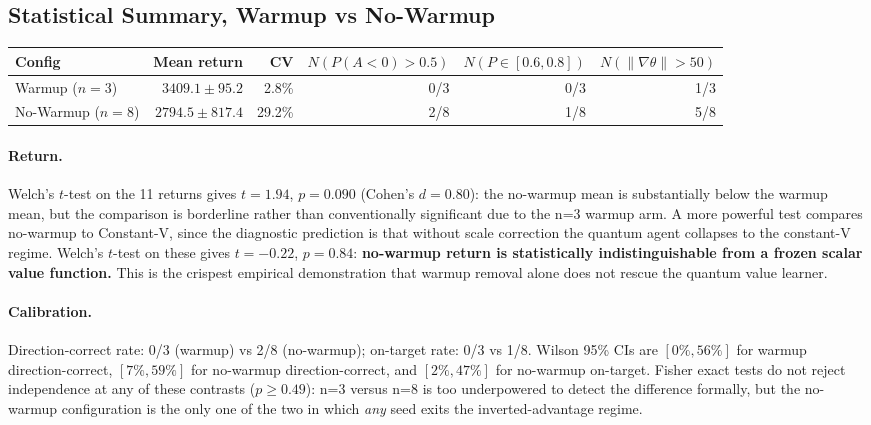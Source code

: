 \documentclass[10pt,a4paper]{article}
\begin{document}
\subsection{Statistical Summary, Warmup vs No-Warmup}

\begin{center}
\setlength{\tabcolsep}{5pt}
\begin{tabular}{lrrrrr}
\toprule
\textbf{Config} & \textbf{Mean return} & \textbf{CV}
  & $N(P(A{<}0)>0.5)$ & $N(P{\in}[0.6,0.8])$
  & $N(\|\nabla\theta\|>50)$ \\
\midrule
Warmup ($n=3$)    & $3409.1 \pm  95.2$ &  2.8\% & 0/3 & 0/3 & 1/3 \\
No-Warmup ($n=8$) & $2794.5 \pm 817.4$ & 29.2\% & 2/8 & 1/8 & 5/8 \\
\bottomrule
\end{tabular}
\end{center}

\paragraph{Return.} Welch's $t$-test on the 11 returns gives $t=1.94$,
$p=0.090$ (Cohen's $d=0.80$): the no-warmup mean is substantially below the
warmup mean, but the comparison is borderline rather than conventionally
significant due to the n=3 warmup arm.
A more powerful test compares no-warmup to Constant-V, since the diagnostic
prediction is that without scale correction the quantum agent collapses to the
constant-V regime. Welch's $t$-test on these gives $t=-0.22$, $p=0.84$:
\textbf{no-warmup return is statistically indistinguishable from a frozen
scalar value function.} This is the crispest empirical demonstration that
warmup removal alone does not rescue the quantum value learner.

\paragraph{Calibration.}
Direction-correct rate: 0/3 (warmup) vs 2/8 (no-warmup); on-target rate:
0/3 vs 1/8.
Wilson 95\% CIs are $[0\%,56\%]$ for warmup direction-correct,
$[7\%,59\%]$ for no-warmup direction-correct, and $[2\%,47\%]$ for no-warmup
on-target.
Fisher exact tests do not reject independence at any of these contrasts
($p\geq0.49$): n=3 versus n=8 is too underpowered to detect the difference
formally, but the no-warmup configuration is the only one of the two in which
\emph{any} seed exits the inverted-advantage regime.
\end{document}
